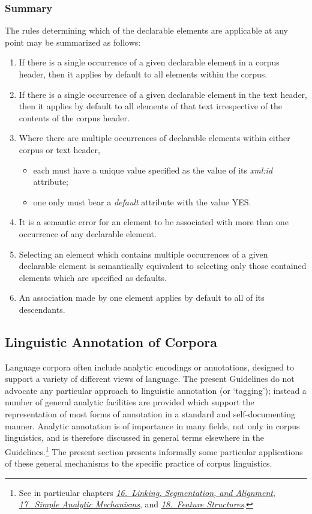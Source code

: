\subsubsection[{Summary}]{Summary}\label{CCAS3}\par
The rules determining which of the declarable elements are applicable at any point may be summarized as follows: \begin{enumerate}
\item If there is a single occurrence of a given declarable element in a corpus header, then it applies by default to all elements within the corpus.
\item If there is a single occurrence of a given declarable element in the text header, then it applies by default to all elements of that text irrespective of the contents of the corpus header.
\item Where there are multiple occurrences of declarable elements within either corpus or text header, \mbox{}\\[-10pt] \begin{itemize}
\item each must have a unique value specified as the value of its {\itshape xml:id} attribute;
\item one only must bear a {\itshape default} attribute with the value YES.
\end{itemize} 
\item It is a semantic error for an element to be associated with more than one occurrence of any declarable element.
\item Selecting an element which contains multiple occurrences of a given declarable element is semantically equivalent to selecting only those contained elements which are specified as defaults.
\item An association made by one element applies by default to all of its descendants. 
\end{enumerate}
\subsection[{Linguistic Annotation of Corpora}]{Linguistic Annotation of Corpora}\label{CCAN}\par
Language corpora often include analytic encodings or annotations, designed to support a variety of different views of language. The present Guidelines do not advocate any particular approach to linguistic annotation (or ‘tagging’); instead a number of general analytic facilities are provided which support the representation of most forms of annotation in a standard and self-documenting manner. Analytic annotation is of importance in many fields, not only in corpus linguistics, and is therefore discussed in general terms elsewhere in the Guidelines.\footnote{See in particular chapters \textit{\hyperref[SA]{16.\ Linking, Segmentation, and Alignment}}, \textit{\hyperref[AI]{17.\ Simple Analytic Mechanisms}}, and \textit{\hyperref[FS]{18.\ Feature Structures}}.} The present section presents informally some particular applications of these general mechanisms to the specific practice of corpus linguistics.
